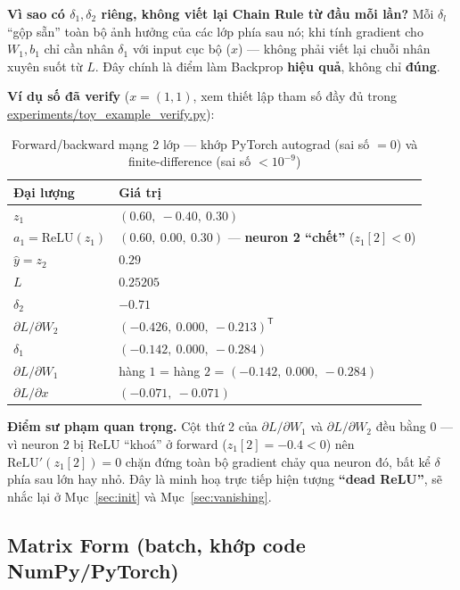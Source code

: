 \documentclass[12pt,a4paper]{report}
\newcommand{\T}{^{\mathsf{T}}}
\begin{document}
\textbf{Vì sao có $\delta_1,\delta_2$ riêng, không viết lại Chain Rule từ
đầu mỗi lần?} Mỗi $\delta_l$ ``gộp sẵn'' toàn bộ ảnh hưởng của các lớp phía
sau nó; khi tính gradient cho $W_1,b_1$ chỉ cần nhân $\delta_1$ với input
cục bộ ($x$) --- không phải viết lại chuỗi nhân xuyên suốt từ $L$. Đây
chính là điểm làm Backprop \textbf{hiệu quả}, không chỉ \textbf{đúng}.

\textbf{Ví dụ số đã verify} ($x=(1,1)$, xem thiết lập tham số đầy đủ trong
\url{experiments/toy_example_verify.py}):

\begin{table}[htbp]
\centering
\caption{Forward/backward mạng 2 lớp --- khớp PyTorch autograd (sai số $=0$)
và finite-difference (sai số $<10^{-9}$)}
\begin{tabular}{@{}ll@{}}
\toprule
\textbf{Đại lượng} & \textbf{Giá trị} \\
\midrule
$z_1$ & $(0.60,\ -0.40,\ 0.30)$ \\
$a_1=\mathrm{ReLU}(z_1)$ & $(0.60,\ 0.00,\ 0.30)$ --- \textbf{neuron 2 ``chết''} ($z_1[2]<0$) \\
$\hat y = z_2$ & $0.29$ \\
$L$ & $0.25205$ \\
$\delta_2$ & $-0.71$ \\
$\partial L/\partial W_2$ & $(-0.426,\ 0.000,\ -0.213)\T$ \\
$\delta_1$ & $(-0.142,\ 0.000,\ -0.284)$ \\
$\partial L/\partial W_1$ & hàng $1$ = hàng $2$ = $(-0.142,\ 0.000,\ -0.284)$ \\
$\partial L/\partial x$ & $(-0.071,\ -0.071)$ \\
\bottomrule
\end{tabular}
\label{tab:2layer_numeric}
\end{table}

\textbf{Điểm sư phạm quan trọng.} Cột thứ 2 của $\partial L/\partial W_1$
và $\partial L/\partial W_2$ đều bằng $0$ --- vì neuron 2 bị ReLU ``khoá'' ở
forward ($z_1[2]=-0.4<0$) nên $\mathrm{ReLU}'(z_1[2])=0$ chặn đứng toàn
bộ gradient chảy qua neuron đó, bất kể $\delta$ phía sau lớn hay nhỏ. Đây
là minh hoạ trực tiếp hiện tượng \textbf{``dead ReLU''}, sẽ nhắc lại ở
Mục~\ref{sec:init} và Mục~\ref{sec:vanishing}.

\subsection{Matrix Form (batch, khớp code NumPy/PyTorch)}
\label{sec:matrixform}
\end{document}
